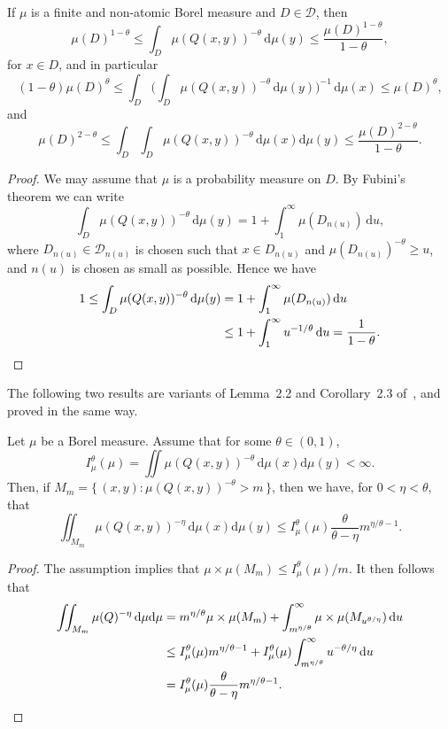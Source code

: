 \documentclass[AHL,Unicode,longabstracts]{cedram}
\newcommand*{\dd}{\mathrm{d}}
\begin{document}
\begin{lemm}\label{lem:energyestimate}
If $\mu$ is a finite and non-atomic Borel measure and $D\in
\mathscr{D}$, then
\[
\mu(D)^{1-\theta} \leq \int_D \mu (Q(x,y))^{-\theta} \, \dd
\mu (y) \leq \frac{\mu(D)^{1 - \theta}}{1 - \theta},
\]
for $x \in D$, and in particular
\[
(1 - \theta) \mu (D)^\theta \leq \int_D \biggl(\int_D \mu (Q(x,y))^{-\theta} \, \dd \mu (y) \biggr)^{-1} \, \dd
\mu (x) \leq \mu (D)^\theta,
\]
and
\[
\mu(D)^{2-\theta} \leq \int_D \int_D \mu(Q(x,y))^{-\theta} \,
\dd \mu(x) \dd \mu (y) \leq \frac{\mu(D)^{2-\theta}}{1 - \theta}.
\]
\end{lemm}

\begin{proof}
We may assume that $\mu$ is a probability measure on $D$. By Fubini's theorem we can write
\[
\int_D \mu (Q(x,y))^{-\theta} \, \dd \mu (y) = 1 +
\int_1^\infty \mu (D_{n(u)}) \, \dd u,
\]
where $D_{n(u)} \in \mathscr{D}_{n(u)}$ is chosen such that $x \in D_{n(u)}$ and $\mu (D_{n(u)})^{-\theta} \geq u$, and $n (u)$ is chosen as small as possible. Hence we have
\begin{align*}
1 \leq \int_D \mu (Q(x,y))^{-\theta} \, \dd \mu (y) &= 1 +
\int_1^\infty \mu (D_{n(u)}) \, \dd u \\ &\leq 1 +
\int_1^\infty u^{-1/\theta} \, \dd u = \frac{1}{1 -
\theta}. \qedhere
\end{align*}
\end{proof}

The following two results are variants of Lemma~2.2 and Corollary~2.3 of~\cite{perssonreeve}, and proved in the same way.

\begin{lemm}\label{lem:Mm}
Let $\mu$ be a Borel measure. Assume that for some $\theta \in (0,1)$,
\[
I_\mu^\theta (\mu) = \iint \mu (Q(x,y))^{-\theta} \,
\dd\mu (x) \dd \mu (y) < \infty.
\]
Then, if $M_m = \{\, (x,y) : \mu (Q(x,y))^{-\theta} > m \,\}$, then we have, for $0 < \eta < \theta$, that
\[
\iint_{M_m} \mu (Q(x,y))^{-\eta} \, \dd \mu (x) \dd
\mu (y) \leq I_\mu^\theta (\mu) \frac{\theta}{\theta - \eta} m^{\eta/\theta - 1}.
\]
\end{lemm}

\begin{proof}
The assumption implies that $\mu \times \mu (M_m) \leq I_\mu^\theta (\mu) /m$. It then follows that
\begin{align*}
\iint_{M_m} \mu (Q)^{-\eta} \, \dd\mu \dd \mu & = m^{\eta/\theta} \mu \times \mu (M_m) +
\int_{m^{\eta/\theta}}^\infty \mu \times \mu (M_{u^{\theta/\eta}})
\, \dd u \\ &\leq I_\mu^\theta (\mu) m^{\eta/\theta - 1} + I_\mu^\theta (\mu) \int_{m^{\eta/\theta}}^\infty u^{-\theta/\eta}
\, \dd u \\ &= I_\mu^\theta (\mu) \frac{\theta}{\theta -
\eta} m^{\eta/\theta - 1}. \qedhere
\end{align*}
\end{proof}
\end{document}
